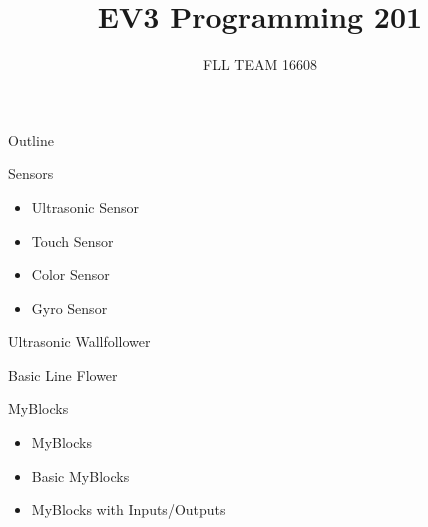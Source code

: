 \documentclass[11pt]{beamer}
\author{FLL TEAM 16608}
\title{EV3 Programming 201}
\begin{document}
\begin{frame}
\titlepage
\end{frame}


\begin{frame}{Outline}
\tableofcontents
\end{frame}

\begin{frame}{Sensors}
\begin{itemize}
\item Ultrasonic Sensor
\item Touch Sensor
\item Color Sensor
\item Gyro Sensor
\end{itemize}
\end{frame}

\begin{frame}{Ultrasonic Wallfollower}
\end{frame}


\begin{frame}{Basic Line Flower}
\end{frame}



\begin{frame}{MyBlocks}
\begin{itemize}
\item MyBlocks
\item Basic MyBlocks
\item MyBlocks with Inputs/Outputs
\end{itemize}
\end{frame}

\begin{frame}
\end{frame}

\begin{frame}
\end{frame}

\begin{frame}
\end{frame}

\begin{frame}
\end{frame}

\begin{frame}
\end{frame}

\begin{frame}
\end{frame}
\end{document}

